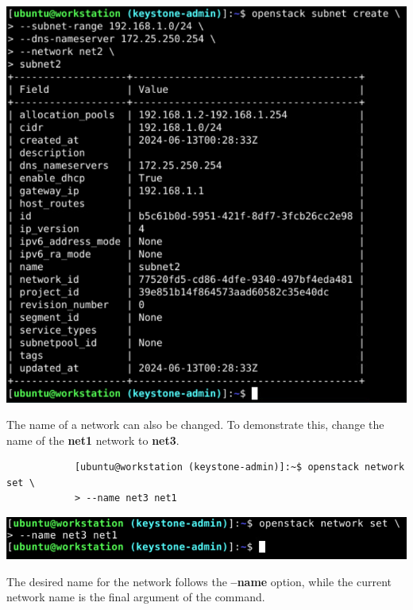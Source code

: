 \documentclass[letterpaper, 12pt]{article}
\begin{document}
\begin{enumerate}
\begin{labstep}
        \begin{center}
            \includegraphics[width=\linewidth]{images/part3/step16.png}
        \end{center}
    \end{labstep}

    \begin{labstep}
        The name of a network can also be changed.
        To demonstrate this, change the name of the \textbf{net1} network to \textbf{net3}.
        \begin{lstlisting}
            [ubuntu@workstation (keystone-admin)]:~$ openstack network set \
            > --name net3 net1
        \end{lstlisting}

        \begin{center}
            \includegraphics[width=\linewidth]{images/part3/step17.png}
        \end{center}
    \end{labstep}

    \begin{notebox}
        The desired name for the network follows the \textbf{--name} option, while the current network name is the final argument of the command.
    \end{notebox}


\end{enumerate}
\end{document}
